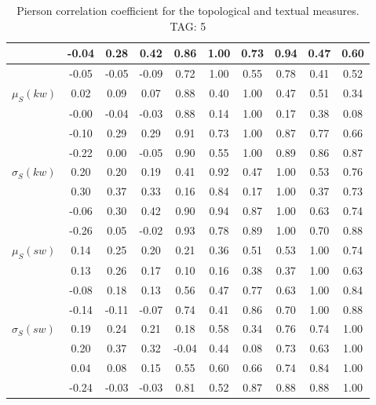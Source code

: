 \begin{table*}[h!]
\begin{center}
\begin{tabular}{| l | c | c | c | c | c | c | c | c | c |}
 & -0.04  & 0.28  & 0.42  & 0.86  & 1.00  & 0.73  & 0.94  & 0.47  & 0.60 \\\hline
 & -0.05  & -0.05  & -0.09  & 0.72  & 1.00  & 0.55  & 0.78  & 0.41  & 0.52 \\\hline
$\mu_S(kw)$ & 0.02  & 0.09  & 0.07  & 0.88  & 0.40  & 1.00  & 0.47  & 0.51  & 0.34 \\\hline
 & -0.00  & -0.04  & -0.03  & 0.88  & 0.14  & 1.00  & 0.17  & 0.38  & 0.08 \\\hline
 & -0.10  & 0.29  & 0.29  & 0.91  & 0.73  & 1.00  & 0.87  & 0.77  & 0.66 \\\hline
 & -0.22  & 0.00  & -0.05  & 0.90  & 0.55  & 1.00  & 0.89  & 0.86  & 0.87 \\\hline
$\sigma_S(kw)$ & 0.20  & 0.20  & 0.19  & 0.41  & 0.92  & 0.47  & 1.00  & 0.53  & 0.76 \\\hline
 & 0.30  & 0.37  & 0.33  & 0.16  & 0.84  & 0.17  & 1.00  & 0.37  & 0.73 \\\hline
 & -0.06  & 0.30  & 0.42  & 0.90  & 0.94  & 0.87  & 1.00  & 0.63  & 0.74 \\\hline
 & -0.26  & 0.05  & -0.02  & 0.93  & 0.78  & 0.89  & 1.00  & 0.70  & 0.88 \\\hline
$\mu_S(sw)$ & 0.14  & 0.25  & 0.20  & 0.21  & 0.36  & 0.51  & 0.53  & 1.00  & 0.74 \\\hline
 & 0.13  & 0.26  & 0.17  & 0.10  & 0.16  & 0.38  & 0.37  & 1.00  & 0.63 \\\hline
 & -0.08  & 0.18  & 0.13  & 0.56  & 0.47  & 0.77  & 0.63  & 1.00  & 0.84 \\\hline
 & -0.14  & -0.11  & -0.07  & 0.74  & 0.41  & 0.86  & 0.70  & 1.00  & 0.88 \\\hline
$\sigma_S(sw)$ & 0.19  & 0.24  & 0.21  & 0.18  & 0.58  & 0.34  & 0.76  & 0.74  & 1.00 \\\hline
 & 0.20  & 0.37  & 0.32  & -0.04  & 0.44  & 0.08  & 0.73  & 0.63  & 1.00 \\\hline
 & 0.04  & 0.08  & 0.15  & 0.55  & 0.60  & 0.66  & 0.74  & 0.84  & 1.00 \\\hline
 & -0.24  & -0.03  & -0.03  & 0.81  & 0.52  & 0.87  & 0.88  & 0.88  & 1.00 \\\hline
\end{tabular}
\caption{Pierson correlation coefficient for the topological and textual measures. TAG: 5}
\end{center}
\end{table*}